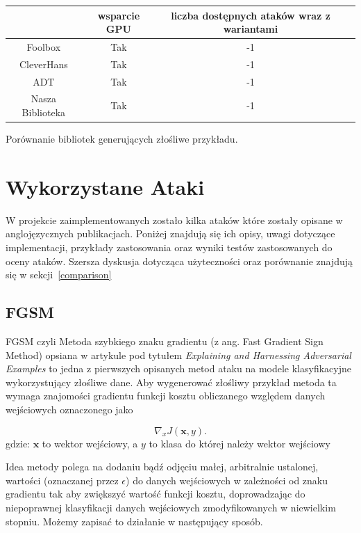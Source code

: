 \documentclass[
    left=2.5cm,         %
    right=2.5cm,        %
    top=2.5cm,          %
    bottom=3cm,         %
    bindingoffset=6mm,  %
    nohyphenation=false %
]{eiti/eiti-thesis}
\renewcommand{\vec}[1]{\mathbf{#1}}
\begin{document}
\begin{center}
    \begin{tabular}{|c|c|c|c|}
        \hline
        & wsparcie GPU & liczba dostępnych ataków wraz z wariantami \\
        \hline
        Foolbox & Tak & -1 \\
        \hline
        CleverHans & Tak & -1 \\
        \hline
        ADT & Tak & -1 \\
        \hline
        Nasza Biblioteka & Tak & -1\\
        \hline
    \end{tabular}
    \caption{Porównanie bibliotek generujących złośliwe przykładu.}
\end{center}

\newpage



\section{Wykorzystane Ataki}
W projekcie zaimplementowanych zostało kilka ataków które zostały opisane w anglojęzycznych publikacjach.
Poniżej znajdują się ich opisy, uwagi dotyczące implementacji, przykłady zastosowania oraz wyniki testów
zastosowanych do oceny ataków. Szersza dyskusja dotycząca użyteczności oraz porównanie znajdują się w sekcji~\ref{comparison}

\subsection{FGSM}
    FGSM czyli Metoda szybkiego znaku gradientu (z ang. Fast Gradient Sign Method) opsiana w artykule
    pod tytułem \textit{Explaining and Harnessing Adversarial Examples}\cite{harnessing} to jedna z pierwszych
    opisanych metod ataku na modele klasyfikacyjne wykorzystujący złośliwe dane.
    Aby wygenerować złośliwy przykład metoda ta wymaga znajomości gradientu funkcji kosztu obliczanego względem danych
    wejściowych oznaczonego jako

    \begin{equation}
        \nabla_{x} J(\vec{x}, y).
    \end{equation}
    gdzie: $\vec{x}$ to wektor wejściowy, a $y$ to klasa do której należy wektor wejściowy

    Idea metody polega na dodaniu bądź odjęciu małej, arbitralnie ustalonej, wartości (oznaczanej przez \(\epsilon\)) do
    danych wejściowych w zależności od znaku gradientu tak aby zwiększyć wartość funkcji kosztu,
    doprowadzając do niepoprawnej klasyfikacji danych wejściowych zmodyfikowanych w niewielkim stopniu.
    Możemy zapisać to działanie w następujący sposób.
\end{document}
